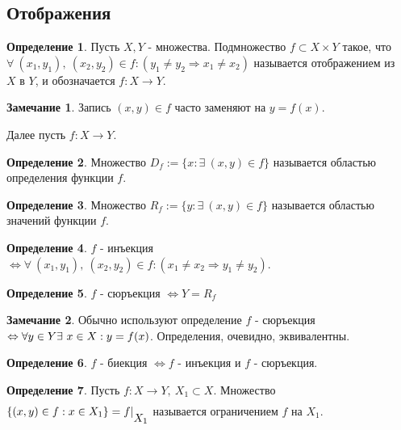 \documentclass[a4paper, 12pt]{article}
\newcommand{\lra}{\Leftrightarrow}
\theoremstyle{definition}
\newtheorem*{definition}{Определение}
\newtheorem*{comm}{Замечание}
\begin{document}
    \subsection{Отображения}
        \begin{definition}
            Пусть $X, Y$ - множества. Подмножество $f\subset X\times Y$ такое, что $\forall\ (x_1,y_1),\ (x_2, y_2)\in f: (y_1\ne y_2 \Rightarrow x_1\ne x_2)$ называется отображением из\\
            $X$ в $Y$, и обозначается $f: X\to Y$.
        \end{definition}
        \begin{comm}
            Запись $(x,y)\in f$ часто заменяют на $y=f(x)$.
        \end{comm}
        Далее пусть $f:X\to Y$. 
        \begin{definition}
            Множество $D_f := \{x: \exists\ (x,y) \in f\}$ называется областью определения функции $f$.
        \end{definition}
        \begin{definition}
            Множество $R_f := \{y: \exists\ (x,y) \in f\}$ называется областью значений функции $f$.
        \end{definition}
        \begin{definition}
            $f$ - инъекция $\lra \forall\ (x_1,y_1),\ (x_2,y_2)\in f: (x_1\ne x_2 \Rightarrow y_1\ne y_2)$.
        \end{definition}
        \begin{definition}
            $f$ - сюръекция $\lra Y=R_f$
        \end{definition}
        \begin{comm}
        Обычно используют определение $f$ - сюръекция $\lra \forall y\in Y \\ \exists\ x\in X: y=f(x)$. Определения, очевидно, эквивалентны.
        \end{comm}
        \begin{definition}
            $f$ - биекция $\lra f$ - инъекция и $f$ - сюръекция.
        \end{definition}
        \begin{definition}
            Пусть $f:X\to Y,\ X_1\subset X$. Множество $\{(x,y)\in f: x\in X_1\}=f|\begin{matrix}
                \null \\ X_1
            \end{matrix}$ называется ограничением $f$ на $X_1$.
        \end{definition}
\end{document}
